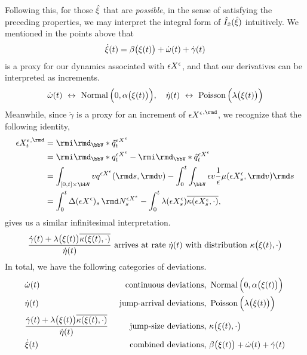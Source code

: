 Following this, for those $\hat{\xi}$ that are \emph{possible}, in the sense of satisfying the preceding properties, we may interpret the integral form of $\hat{I}_{\hat{x}}(\hat{\xi})$ intuitively.
We mentioned in the points above that
\[
  \dot{\xi}(t) = \beta\big(\xi(t)\big) + \dot\omega(t) + \dot\gamma(t)
\]
is a proxy for our dynamics associated with $\epsilon X^\epsilon$, and that our derivatives can be interpreted as increments.
\begin{equation*}
  \dot\omega(t) ~\leftrightarrow~ \operatorname{Normal}\Big(0, \alpha\big(\xi(t)\big)\Big), \quad
  \dot\eta(t) ~\leftrightarrow~ \operatorname{Poisson}\Big(\lambda\big(\xi(t)\big)\Big)
\end{equation*}
Meanwhile, since $\dot\gamma$ is a proxy for an increment of ${\Xe}^{,\rmd}$, we recognize that the following identity,
\begin{align*}
  {\Xe_t}^{,\rmd} 
  &= \id_\vecSpace \ast \compensate{\jumpMeas^{\Xe}}_t \\
  &= \id_\vecSpace \ast \jumpMeas^{\Xe}_t - \id_\vecSpace \ast \predproj{\jumpMeas^{\Xe}}_t \\
  &= \int_{[0,t]\times \vecSpace} \markVar \jumpMeas^{\Xe}(\rmd s, \rmd\markVar) - \int_0^t \int_\vecSpace \epsilon\markVar \frac1\epsilon\affJump(\Xe_s, \rmd\markVar) \rmd s \\
  &= \int_0^t \Delta(\Xe)_s \, \rmd\N^{\Xe}_s  - \int_0^t \affInt(\Xe_s) \overline{\affDist(\Xe_s, \cdot)},
\end{align*}
gives us a similar infinitesimal interpretation.
\begin{equation*}
  \frac{\dot\gamma(t) + \lambda\big(\xi(t)\big) \overline{\kappa(\xi(t), \cdot)}}{\dot\eta(t)} \text{ arrives at rate } \dot\eta(t) \text{ with distribution } \kappa\big(\xi(t), \cdot\big)
\end{equation*}
In total, we have the following categories of deviations.
\begin{align*}
  &\dot\omega(t) & \text{ continuous deviations, }&\operatorname{Normal}\Big(0, \alpha\big(\xi(t)\big)\Big) \\
  &\dot\eta(t) & \text{ jump-arrival deviations, }& \operatorname{Poisson}\Big(\lambda\big(\xi(t)\big)\Big) \\
  &\frac{\dot\gamma(t)+\lambda\big(\xi(t)\big)\overline{\kappa(\xi(t), \cdot)}}{\dot\eta(t)} & \text{ jump-size deviations, }& \kappa\big(\xi(t), \cdot\big) \\
  &\dot{\xi}(t) & \text{ combined deviations, } & \beta\big(\xi(t)\big) + \dot\omega(t) + \dot\gamma(t)
\end{align*}

